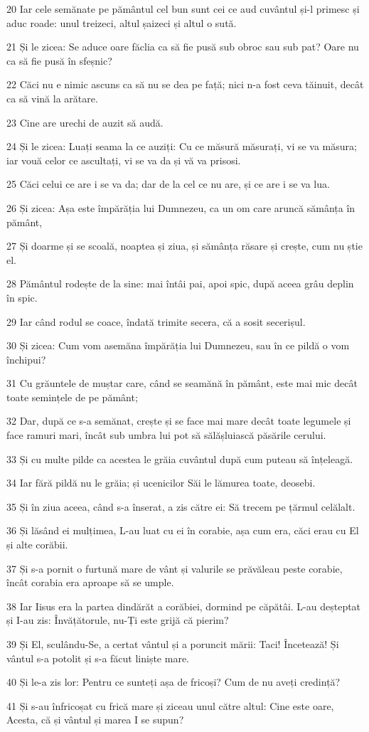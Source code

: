 \par 20 Iar cele semănate pe pământul cel bun sunt cei ce aud cuvântul și-l primesc și aduc roade: unul treizeci, altul șaizeci și altul o sută.
\par 21 Și le zicea: Se aduce oare făclia ca să fie pusă sub obroc sau sub pat? Oare nu ca să fie pusă în sfeșnic?
\par 22 Căci nu e nimic ascuns ca să nu se dea pe față; nici n-a fost ceva tăinuit, decât ca să vină la arătare.
\par 23 Cine are urechi de auzit să audă.
\par 24 Și le zicea: Luați seama la ce auziți: Cu ce măsură măsurați, vi se va măsura; iar vouă celor ce ascultați, vi se va da și vă va prisosi.
\par 25 Căci celui ce are i se va da; dar de la cel ce nu are, și ce are i se va lua.
\par 26 Și zicea: Așa este împărăția lui Dumnezeu, ca un om care aruncă sămânța în pământ,
\par 27 Și doarme și se scoală, noaptea și ziua, și sămânța răsare și crește, cum nu știe el.
\par 28 Pământul rodește de la sine: mai întâi pai, apoi spic, după aceea grâu deplin în spic.
\par 29 Iar când rodul se coace, îndată trimite secera, că a sosit secerișul.
\par 30 Și zicea: Cum vom asemăna împărăția lui Dumnezeu, sau în ce pildă o vom închipui?
\par 31 Cu grăuntele de muștar care, când se seamănă în pământ, este mai mic decât toate semințele de pe pământ;
\par 32 Dar, după ce s-a semănat, crește și se face mai mare decât toate legumele și face ramuri mari, încât sub umbra lui pot să sălășluiască păsările cerului.
\par 33 Și cu multe pilde ca acestea le grăia cuvântul după cum puteau să înțeleagă.
\par 34 Iar fără pildă nu le grăia; și ucenicilor Săi le lămurea toate, deosebi.
\par 35 Și în ziua aceea, când s-a înserat, a zis către ei: Să trecem pe țărmul celălalt.
\par 36 Și lăsând ei mulțimea, L-au luat cu ei în corabie, așa cum era, căci erau cu El și alte corăbii.
\par 37 Și s-a pornit o furtună mare de vânt și valurile se prăvăleau peste corabie, încât corabia era aproape să se umple.
\par 38 Iar Iisus era la partea dindărăt a corăbiei, dormind pe căpătâi. L-au deșteptat și I-au zis: Învățătorule, nu-Ți este grijă că pierim?
\par 39 Și El, sculându-Se, a certat vântul și a poruncit mării: Taci! Încetează! Și vântul s-a potolit și s-a făcut liniște mare.
\par 40 Și le-a zis lor: Pentru ce sunteți așa de fricoși? Cum de nu aveți credință?
\par 41 Și s-au înfricoșat cu frică mare și ziceau unul către altul: Cine este oare, Acesta, că și vântul și marea I se supun?

